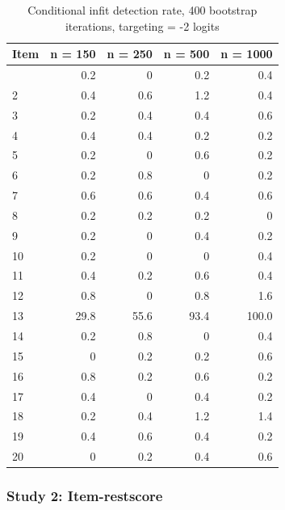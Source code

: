 \documentclass[
  letterpaper,
  DIV=11,
  numbers=noendperiod]{scrartcl}
\begin{document}
\begin{longtable}[]{@{}lrrrr@{}}

\caption{\label{tbl-ifbresults4002}Conditional infit detection rate, 400
bootstrap iterations, targeting = -2 logits}

\tabularnewline

\toprule\noalign{}
Item & n = 150 & n = 250 & n = 500 & n = 1000 \\
\midrule\noalign{}
\endhead
\bottomrule\noalign{}
\endlastfoot
1 & 0.2 & 0 & 0.2 & 0.4 \\
2 & 0.4 & 0.6 & 1.2 & 0.4 \\
3 & 0.2 & 0.4 & 0.4 & 0.6 \\
4 & 0.4 & 0.4 & 0.2 & 0.2 \\
5 & 0.2 & 0 & 0.6 & 0.2 \\
6 & 0.2 & 0.8 & 0 & 0.2 \\
7 & 0.6 & 0.6 & 0.4 & 0.6 \\
8 & 0.2 & 0.2 & 0.2 & 0 \\
9 & 0.2 & 0 & 0.4 & 0.2 \\
10 & 0.2 & 0 & 0 & 0.4 \\
11 & 0.4 & 0.2 & 0.6 & 0.4 \\
12 & 0.8 & 0 & 0.8 & 1.6 \\
13 & 29.8 & 55.6 & 93.4 & 100.0 \\
14 & 0.2 & 0.8 & 0 & 0.4 \\
15 & 0 & 0.2 & 0.2 & 0.6 \\
16 & 0.8 & 0.2 & 0.6 & 0.2 \\
17 & 0.4 & 0 & 0.4 & 0.2 \\
18 & 0.2 & 0.4 & 1.2 & 1.4 \\
19 & 0.4 & 0.6 & 0.4 & 0.2 \\
20 & 0 & 0.2 & 0.4 & 0.6 \\

\end{longtable}

\subsubsection{Study 2: Item-restscore}\label{sec-tblirresults}
\end{document}
